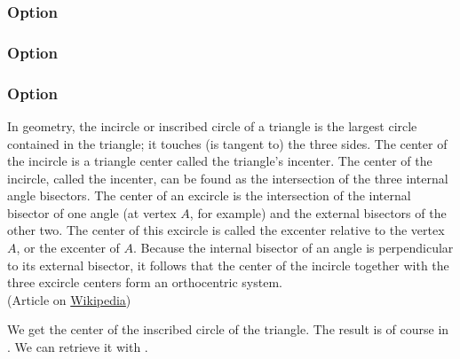 \subsubsection{Option }
\begin{tkzexample}[latex=6cm,small]
\end{tkzexample}

\subsubsection{Option }
\begin{tkzexample}[latex=6cm,small]
\end{tkzexample}

\subsubsection{Option }
In geometry, the incircle or inscribed circle of a triangle is the largest circle contained in the triangle; it touches (is tangent to) the three sides. The center of the incircle is a triangle center called the triangle's incenter.
The center of the incircle, called the incenter, can be found as the intersection of the three internal angle bisectors. The center of an excircle is the intersection of the internal bisector of one angle (at vertex $A$, for example) and the external bisectors of the other two. The center of this excircle is called the excenter relative to the vertex $A$, or the excenter of $A$. Because the internal bisector of an angle is perpendicular to its external bisector, it follows that the center of the incircle together with the three excircle centers form an orthocentric system.\\
(Article on \href{https://en.wikipedia.org/wiki/Incircle_and_excircles_of_a_triangle}{Wikipedia})
 
 \medskip
 We get the center of the inscribed circle of the triangle. The result is of course in . We can retrieve it with .

